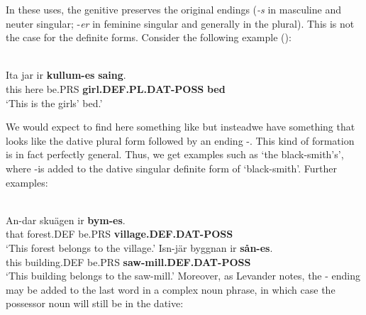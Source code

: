 

In these uses, the genitive preserves the original endings (\textit{\nobreakdash-s }in masculine and neuter singular; \nobreakdash-\textit{er} in feminine singular and generally in the plural). This is not the case for the definite forms. Consider the following example (\citet[96]{Levander1909}):


\ea\label{}
\\
\gll Ita  jar  ir  \textbf{kullum-es} \textbf{saing}.\\
this  here  be.PRS  \textbf{girl.DEF.PL.DAT-POSS} \textbf{bed}\\
\glt ‘This is the girls’ bed.’
\z

We would expect to find here something like but instead\textstyleLinguisticExample{ }we have something that looks like the dative plural form  followed by an ending \nobreakdash-. This kind of formation is in fact perfectly general. Thus, we get examples such as  ‘the black-smith’s’, where \nobreakdash-is added to the dative singular definite form  of  ‘black-smith’. Further examples:


\ea\label{}
\\
	\ea
		\gll An-dar  skuägen  ir  \textbf{bym-es}.\\
			that  forest.DEF  be.PRS  \textbf{village.DEF.DAT-POSS}\\
		\glt ‘This forest belongs to the village.’
	\ex
		\gll Isn-jär  byggnan  ir  \textbf{sån-es}.\\
		this  building.DEF  be.PRS  \textbf{saw-mill.DEF.DAT-POSS}\\
		\glt  ‘This building belongs to the saw-mill.’
	\z
\z 
Moreover, as Levander notes, the \nobreakdash- ending may be added to the last word in a complex noun phrase, in which case the possessor noun will still be in the dative:


